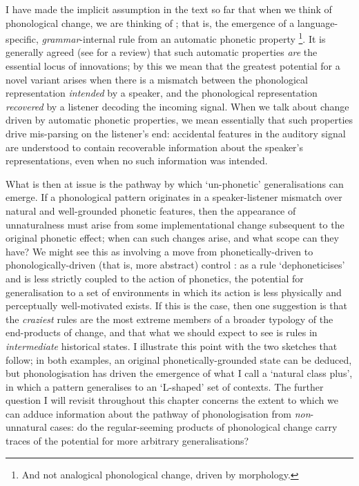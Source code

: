 I have made the implicit assumption in the text so far that when we think of phonological change, we are thinking of ; that is, the emergence of a language-specific, \emph{grammar}-internal rule from an automatic phonetic property \citep{Hyman1976}\footnote{And not analogical phonological change, driven by morphology.}. It is generally agreed (see \citealt{BermudezOtero2007} for a review) that such automatic properties \emph{are} the essential locus of innovations; by this we mean that the greatest potential for a novel variant arises when there is a mismatch between the phonological representation \emph{intended} by a speaker, and the phonological representation \emph{recovered} by a listener decoding the incoming signal. When we talk about change driven by automatic phonetic properties, we mean essentially that such properties drive mis-parsing on the listener's end: accidental features in the auditory signal are understood to contain recoverable information about the speaker's representations, even when no such information was intended.

What is then at issue is the pathway by which `un-phonetic' generalisations can emerge. If a phonological pattern originates in a speaker-listener mismatch over natural and well-grounded phonetic features, then the appearance of unnaturalness must arise from some implementational change subsequent to the original phonetic effect; when can such changes arise, and what scope can they have? We might see this as involving a move from phonetically-driven to phonologically-driven (that is, more abstract) control \citep{Kiparsky1995,Janda2003}: as a rule `dephoneticises' and is less strictly coupled to the action of phonetics, the potential for generalisation to a set of environments in which its action is less physically and perceptually well-motivated exists. If this is the case, then one suggestion is that the \emph{craziest} \citep{Bach1972} rules are the most extreme members of a broader typology of the end-products of change, and that what we should expect to see is rules in \emph{intermediate} historical states. I illustrate this point with the two sketches that follow; in both examples, an original phonetically-grounded state can be deduced, but phonologisation has driven the emergence of what I call a `natural class plus', in which a pattern generalises to an `L-shaped' set of contexts. The further question I will revisit throughout this chapter concerns the extent to which we can adduce information about the pathway of phonologisation from \emph{non}-unnatural cases: do the regular-seeming products of phonological change carry traces of the potential for more arbitrary generalisations?

